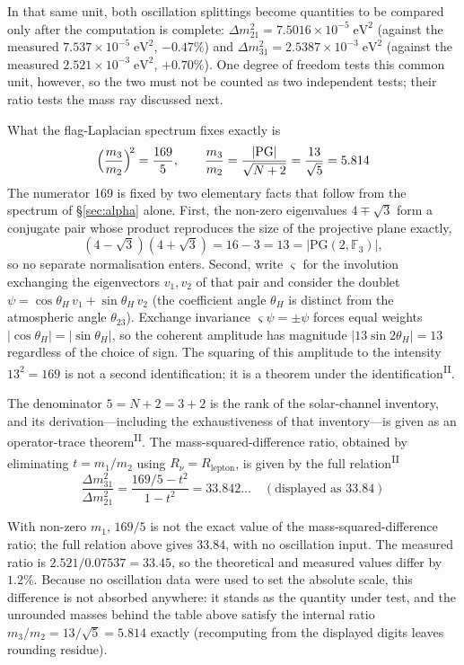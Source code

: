 \documentclass[12pt,a4paper]{article}
\newcommand{\PII}{\textsuperscript{\textup{II}}}
\begin{document}
In that same unit, both oscillation splittings become quantities to be compared only after the computation is complete: $\Delta m^2_{21} = 7.5016 \times 10^{-5}\;\mathrm{eV}^2$ (against the measured $7.537 \times 10^{-5}\;\mathrm{eV}^2$, $-0.47\%$) and $\Delta m^2_{31} = 2.5387 \times 10^{-3}\;\mathrm{eV}^2$ (against the measured $2.521 \times 10^{-3}\;\mathrm{eV}^2$, $+0.70\%$). One degree of freedom tests this common unit, however, so the two must not be counted as two independent tests; their ratio tests the mass ray discussed next.

What the flag-Laplacian spectrum fixes exactly is
\[\Bigl(\frac{m_3}{m_2}\Bigr)^{\!2} = \frac{169}{5},\qquad \frac{m_3}{m_2} = \frac{|\mathrm{PG}|}{\sqrt{N+2}} = \frac{13}{\sqrt{5}} = 5.814\]
The numerator 169 is fixed by two elementary facts that follow from the spectrum of \S\ref{sec:alpha} alone. First, the non-zero eigenvalues $4\mp\sqrt3$ form a conjugate pair whose product reproduces the size of the projective plane exactly,
\begin{equation}
(4-\sqrt3)(4+\sqrt3) = 16 - 3 = 13 = |\mathrm{PG}(2,\mathbb F_3)| ,
\end{equation}
so no separate normalisation enters. Second, write $\varsigma$ for the involution exchanging the eigenvectors $v_{1},v_{2}$ of that pair and consider the doublet $\psi = \cos\theta_H\,v_1 + \sin\theta_H\,v_2$ (the coefficient angle $\theta_H$ is distinct from the atmospheric angle $\theta_{23}$). Exchange invariance $\varsigma\psi = \pm\psi$ forces equal weights $|\cos\theta_H| = |\sin\theta_H|$, so the coherent amplitude has magnitude $|13\sin 2\theta_H| = 13$ regardless of the choice of sign. The squaring of this amplitude to the intensity $13^2 = 169$ is not a second identification; it is a theorem under the identification\PII{}.

The denominator $5 = N + 2 = 3 + 2$ is the rank of the solar-channel inventory, and its derivation---including the exhaustiveness of that inventory---is given as an operator-trace theorem\PII{}. The mass-squared-difference ratio, obtained by eliminating $t = m_1/m_2$ using $R_\nu = R_\mathrm{lepton}$, is given by the full relation\PII{}
\[\frac{\Delta m^2_{31}}{\Delta m^2_{21}} = \frac{169/5 - t^2}{1 - t^2} = 33.842\ldots\quad(\text{displayed as } 33.84)\]

With non-zero $m_1$, $169/5$ is not the exact value of the mass-squared-difference ratio; the full relation above gives $33.84$, with no oscillation input. The measured ratio is $2.521/0.07537 = 33.45$, so the theoretical and measured values differ by $1.2\%$. Because no oscillation data were used to set the absolute scale, this difference is not absorbed anywhere: it stands as the quantity under test, and the unrounded masses behind the table above satisfy the internal ratio $m_3/m_2 = 13/\sqrt5 = 5.814$ exactly (recomputing from the displayed digits leaves rounding residue).
\end{document}
